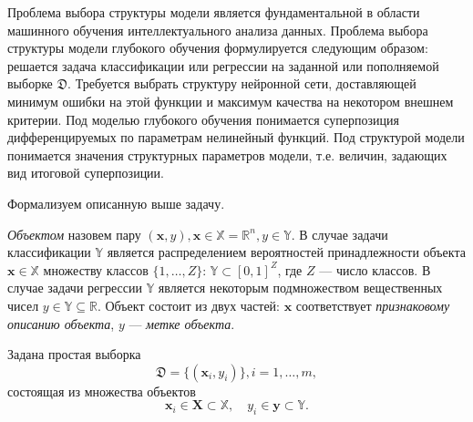 Проблема  выбора структуры модели является фундаментальной в области машинного обучения интеллектуального анализа данных.
Проблема выбора структуры модели глубокого обучения формулируется следующим образом: решается задача классификации или регрессии на заданной или пополняемой выборке $\mathfrak{D}$. Требуется выбрать структуру нейронной сети, доставляющей минимум ошибки на этой функции и максимум качества на некотором внешнем критерии.
 Под моделью глубокого обучения понимается суперпозиция дифференцируемых по параметрам нелинейный функций. Под структурой модели понимается значения структурных параметров модели, т.е. величин, задающих вид итоговой суперпозиции. 

Формализуем описанную выше задачу.
\begin{defin}
\textit{Объектом} назовем пару $(\mathbf{x}, y), \mathbf{x} \in \mathbb{X} =  \mathbb{R}^n, y \in \mathbb{Y}$. В случае задачи классификации $\mathbb{Y}$ является распределением вероятностей принадлежности объекта $\mathbf{x} \in \mathbb{X}$ множеству классов $\{1, \dots, Z\}$: $\mathbb{Y} \subset [0,1]^Z$, где $Z$ --- число классов. В случае задачи регрессии $\mathbb{Y}$ является некоторым подмножеством вещественных чисел ${y} \in \mathbb{Y}  \subseteq \mathbb{R}$.
Объект состоит из двух частей: $\mathbf{x}$  соответствует \textit{признаковому описанию объекта}, $y$ --- \textit{метке объекта}.
\end{defin}

Задана простая выборка \begin{equation}\label{eq:dataset}\mathfrak{D} = \{(\mathbf{x}_i,y_i)\}, i = 1,\dots,m,\end{equation} состоящая из множества объектов $$\mathbf{x}_i \in \mathbf{X} \subset  \mathbb{X}, \quad {y}_i \in \mathbf{y} \subset \mathbb{Y}.$$ 


